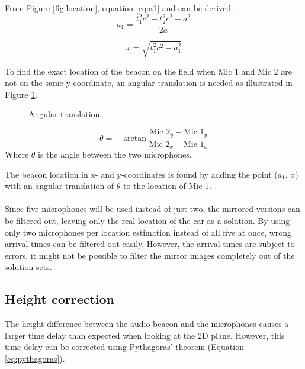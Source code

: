 \documentclass[final]{scrreprt} %
\begin{document}
From Figure \ref{fig:location}, equation \ref{eq:a1} and \label{eq:x} can be derived.
\begin{equation}
	a_1 = \frac{t_1^2 c^2 - t_2^2 c^2 + a^2}{2 a}
\label{eq:a1}
\end{equation}

\begin{equation}
	x = \sqrt{t_1^2 c^2 - a_1^2}
	\label{eq:x}
\end{equation}

To find the exact location of the beacon on the field when Mic 1 and Mic 2 are not on the same y-coordinate, an angular translation is needed as illustrated in Figure \ref{fig:angular-translation}.

\begin{figure} [H]
\centering
	\caption{Angular translation.}
	\label{fig:angular-translation}
\end{figure}

\begin{equation}
	\theta = -\arctan{\frac{\text{Mic 2}_y - \text{Mic 1}_y}{\text{Mic 2}_x - \text{Mic 1}_x}}
	\label{eq:theta}
\end{equation}
Where $\theta$ is the angle between the two microphones.

The beacon location in x- and y-coordinates is found by adding the point ($a_1$, $x$) with an angular translation of $\theta$ to the location of Mic 1.
\\ \\
Since five microphones will be used instead of just two, the mirrored versions can be filtered out, leaving only the real location of the car as a solution.
By using only two microphones per location estimation instead of all five at once, wrong arrival times can be filtered out easily.
However, the arrival times are subject to errors, it might not be possible to filter the mirror images completely out of the solution sets.

\subsection{Height correction}
The height difference between the audio beacon and the microphones causes a larger time delay than expected when looking at the 2D plane.
However, this time delay can be corrected using Pythagoras' theorem (Equation \ref{eq:pythagoras}).
\end{document}
